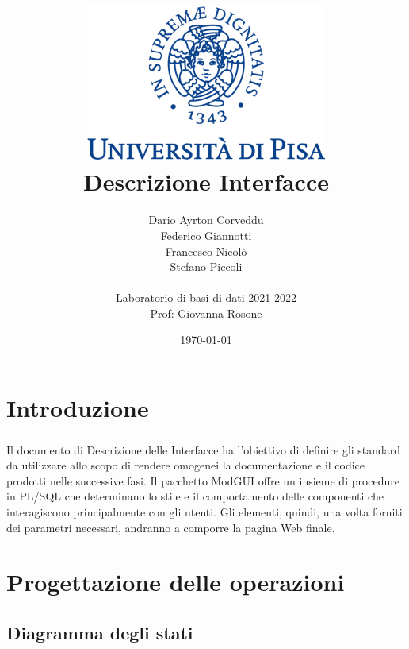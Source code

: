 \documentclass[a4paper, 12pt]{report}
\begin{document}
\title{
\includegraphics[scale=1]{Immagini/logounipi.png} \\
\vspace*{1in}
\textbf{Descrizione Interfacce}}
\author{Dario Ayrton Corveddu\\
        Federico Giannotti\\
        Francesco Nicolò\\
        Stefano Piccoli\\
		\vspace*{0.5in} \\
		Laboratorio di basi di dati 2021-2022\\
        Prof: Giovanna Rosone
       } \date{\today}
\maketitle
\tableofcontents
	\chapter*{Introduzione}
        \paragraph{}Il documento di Descrizione delle Interfacce ha l'obiettivo di definire gli standard da utilizzare allo 
        scopo di rendere omogenei la documentazione e il codice prodotti nelle successive fasi.
        Il pacchetto ModGUI offre un insieme di procedure in PL/SQL che determinano lo stile e il comportamento
        delle componenti che interagiscono principalmente con gli utenti. Gli elementi, quindi, una volta forniti dei 
        parametri necessari, andranno a comporre la pagina Web finale.

    \chapter{Progettazione delle operazioni}
        \section{Diagramma degli stati}
\end{document}
